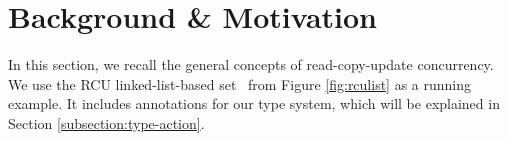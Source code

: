 \section{Background \& Motivation}
In this section, we recall the general concepts of read-copy-update concurrency.
We use the RCU linked-list-based set~\cite{McKenney2015SomeEO} from Figure \ref{fig:rculist} as a running example.  It includes annotations for our type system, which will be explained in Section \ref{subsection:type-action}.
